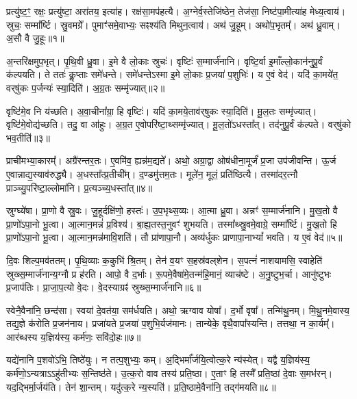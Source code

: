 प्रत्यु॑ष्ट॒ꣳ॒ रक्षः॒ प्रत्यु॑ष्टा॒ अरा॑तय॒ इत्या॑ह।
रक्ष॑सा॒मप॑हत्यै।
अ॒ग्नेर्व॒स्तेजि॑ष्ठेन॒ तेज॑सा॒ निष्ट॑पा॒मीत्या॑ह मेध्य॒त्वाय॑।
स्रुचः॒ सम्मा᳚र्ष्टि।
स्रु॒वमग्रे᳚।
पुमाꣳ॑समे॒वाभ्यः॒ सꣴश्य॑ति मिथुन॒त्वाय॑।
अथ॑ जु॒हूम्।
अथो॑प॒भृतम्᳚।
अथ॑ ध्रु॒वाम्।
अ॒सौ वै जु॒हूः॥१॥\ip

अ॒न्तरि॑क्षमुप॒भृत्।
पृ॒थि॒वी ध्रु॒वा।
इ॒मे वै लो॒काः स्रुचः॑।
वृष्टिः॑ स॒म्मार्ज॑नानि।
वृष्टि॒र्वा इ॒माँल्लो॒कान॑नुपू॒र्वं क॑ल्पयति।
ते ततः॑ कॢ॒प्ताः समे॑धन्ते।
समे॑धन्ते\-ऽस्मा इ॒मे लो॒काः प्र॒जया॑ प॒शुभिः॑।
य ए॒वं वेद॑।
यदि॑ का॒मये॑त॒ वर्‌\mbox{}षु॑कः प॒र्जन्यः॑ स्या॒दिति॑।
अ॒ग्र॒तः सम्मृ॑ज्यात्॥२॥\ip

वृष्टि॑मे॒व नि य॑च्छति।
अ॒वा॒चीना᳚ग्रा॒ हि वृष्टिः॑।
यदि॑ का॒मये॒ताव॑र्‌\mbox{}षुकः स्या॒दिति॑।
मू॒ल॒तः सम्मृ॑ज्यात्।
वृष्टि॑मे॒वोद्य॑च्छति।
तदु॒ वा आ॑हुः।
अ॒ग्र॒त ए॒वोपरि॑ष्टा॒थ्सम्मृ॑\-ज्यात्।
मू॒ल॒तो॑\-ऽधस्ता᳚त्।
तद॑नुपू॒र्वं क॑ल्पते।
वर्‌\mbox{}षु॑को भव॒तीति॑॥३॥\ip

प्राची॑मभ्या॒कारम्᳚।
अग्रै॑रन्तर॒तः।
ए॒वमि॑व॒ ह्यन्न॑म॒द्यते᳚।
अथो॒ अग्रा॒द्वा ओष॑धीना॒मूर्जं॑ प्र॒जा उप॑जीवन्ति।
ऊ॒र्ज ए॒वान्नाद्य॒स्या\-व॑\-रुद्ध्यै।
अ॒धस्ता᳚त्प्र॒तीची᳚म्।
द॒ण्डमु॑त्तम॒तः।
मूले॑न॒ मूलं॒ प्रति॑\-ष्ठित्यै।
तस्मा॑दर॒त्नौ प्राञ्च्यु॒परि॑ष्टा॒ल्लोमा॑नि।
प्र॒त्यञ्च्य॒धस्ता᳚त्॥४॥\ip

स्रुग्घ्ये॑षा।
प्रा॒णो वै स्रु॒वः।
जु॒हूर्दक्षि॑णो॒ हस्तः॑।
उ॒प॒भृथ्स॒व्यः।
आ॒त्मा ध्रु॒वा।
अन्नꣳ॑ स॒म्मार्ज॑नानि।
मु॒ख॒तो वै प्रा॒णो॑\-ऽपा॒नो भू॒त्वा।
आ॒त्मान॒मन्नं॑ प्र॒विश्य॑।
बा॒ह्य॒तस्त॒नुवꣳ॑ शुभयति।
तस्मा᳚थ्स्रु॒वमे॒वाग्रे॒ सम्मा᳚र्ष्टि।
मु॒ख॒तो हि प्रा॒णो॑\-ऽपा॒नो भू॒त्वा।
आ॒त्मान॒मन्न॑मावि॒शति॑।
तौ प्रा॑णापा॒नौ।
अव्य॑र्धुकः प्राणापा॒नाभ्यां᳚ भवति।
य ए॒वं वेद॑॥५॥\ip\anuvakamend[जु॒हूर्मृ॑ज्याद्भव॒तीति॑ प्र॒त्यञ्च्य॒धस्ता᳚न्मार्ष्टि॒ पञ्च॑ च]

दि॒वः शिल्प॒मव॑ततम्।
पृ॒थि॒व्याः क॒कुभि॑ श्रि॒तम्।
तेन॑ व॒यꣳ स॒हस्र॑वल्‌शेन।
स॒पत्नं॑ नाशयामसि॒ स्वाहेति॑ स्रुख्स॒म्मार्ज॑नान्य॒ग्नौ प्र ह॑रति।
आपो॒ वै द॒र्भाः।
रू॒पमे॒वैषा॑मे॒तन्म॑हि॒मानं॒ व्याच॑ष्टे।
अ॒नु॒ष्टुभ॒र्चा।
आनु॑ष्टुभः प्र॒जा\-प॑तिः।
प्रा॒जा॒प॒त्यो वे॒दः।
वे॒दस्याग्रꣴ॑ स्रुख्स॒म्मार्ज॑नानि॥६॥\ip

स्वेनै॒वैना॑नि॒ छन्द॑सा।
स्वया॑ दे॒वत॑या॒ सम॑र्धयति।
अथो॒ ऋग्वाव योषा᳚।
द॒र्भो वृषा᳚।
तन्मि॑थु॒नम्।
मि॒थु॒नमे॒वास्य॒ तद्य॒ज्ञे क॑रोति प्र॒जन॑नाय।
प्रजा॑यते प्र॒जया॑ प॒शुभि॒र्यज॑मानः।
तान्येके॒ वृथै॒वापा᳚स्यन्ति।
तत्तथा॒ न का॒र्यम्᳚।
आर॑ब्धस्य य॒ज्ञिय॑स्य॒ कर्म॑णः॒ सवि॑दो॒हः॥७॥\ip

यद्ये॑नानि प॒शवो॑ऽभि॒ तिष्ठे॑युः।
न तत्प॒शुभ्यः॒ कम्।
अ॒द्भिर्मा᳚र्जयि॒त्वोत्क॒रे न्य॑स्येत्।
यद्वै य॒ज्ञिय॑स्य॒ कर्म॑णो॒\-ऽन्यत्राऽऽहु॑तीभ्यः स॒न्तिष्ठ॑ते।
उ॒त्क॒रो वाव तस्य॑ प्रति॒ष्ठा।
ए॒ताꣳ हि तस्मै᳚ प्रति॒ष्ठां दे॒वाः स॒मभ॑रन्।
यद॒द्भिर्मा॒र्जय॑ति।
तेन॑ शा॒न्तम्।
यदु॑त्क॒रे न्य॒स्यति॑।
प्र॒ति॒ष्ठामे॒वैना॑नि॒ तद्ग॑मयति॥८॥\ip

